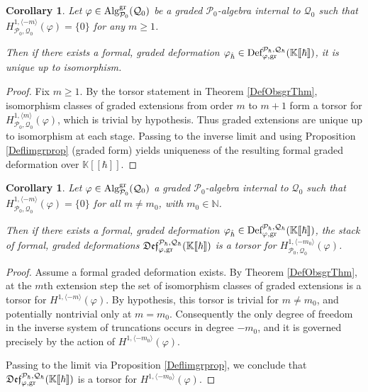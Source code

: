 \documentclass[11pt]{amsart}
\numberwithin{equation}{section}
\newtheorem{coro}[theo]{Corollary}
\theoremstyle{definition}
\newcommand{\bb}{\mathbb}
\newcommand{\mc}{\mathcal}
\newcommand{\Def}{{\textup{Def}}}
\newcommand{\fDef}{{\mathfrak{Def}}}
\newcommand{\Ph}{{\mathcal{P}_\hbar}}
\newcommand{\Qh}{{\mathcal{Q}_\hbar}}
\newcommand{\fph}{{[\![\hbar]\!]}}
\newcommand{\gd}{{\textup{gr}}}
\newcommand{\K}{{\bb K}}
\newcommand{\Alg}{{\textup{Alg}}}
\newcommand{\0}{{\textbf{0}}}
\def\IN{\mathbb{N}}
\begin{document}
\begin{coro}\label{forungrcoro} 
Let $\varphi\in \Alg_{\mc P_0}^\gd(\mc Q_0)$ be a graded $\mc P_0$-algebra internal to $\mc Q_0$ such that $H^{1,\langle -m\rangle}_{\mc P_0,\mc Q_0}(\varphi)=\{0\}$ for any $m\ge1$.

Then if there exists a formal, graded deformation $\varphi_{\hat{\hbar}}\in \Def_{\varphi,\gd}^{\Ph,\Qh}(\K\fph)$, it is unique up to isomorphism.
	
\end{coro}
\begin{proof}
Fix $m\ge 1$. By the torsor statement in Theorem \ref{DefObsgrThm}, isomorphism classes of graded extensions from order $m$ to $m+1$ form a torsor for $H^{1,\langle m\rangle}_{\mc P_0,\mc Q_0}(\varphi)$, which is trivial by hypothesis. Thus graded extensions are unique up to isomorphism at each stage. Passing to
the inverse limit and using Proposition \ref{Deflimgrprop} (graded form) yields uniqueness of the resulting formal graded deformation over $\K\fph$.
\end{proof}

\begin{coro}\label{grtorcoro} 
Let $\varphi\in \Alg_{\mc P_0}^\gd(\mc Q_0)$ a graded $\mc P_0$-algebra internal to $\mc Q_0$ such that \mbox{$H^{1,\langle -m \rangle}_{\mc P_0,\mc Q_0}(\varphi)=\{0\}$} for all $m\neq m_0$, with $m_0 \in \IN$. 

Then if there exists a formal, graded deformation $\varphi_{\hat{\hbar}}\in \Def_{\varphi,\gd}^{\Ph,\Qh}(\K\fph)$, the stack of formal, graded deformations $\fDef_{\varphi,\gd}^{\Ph,\Qh}(\K\fph)  $ is a torsor for $H^{1,\langle -m_0 \rangle}_{\mc P_0,\mc Q_0}(\varphi)$.
\end{coro}
\begin{proof}
	Assume a formal graded deformation exists. By Theorem \ref{DefObsgrThm}, at the $m$th extension step the set of isomorphism classes of graded extensions is a torsor for $H^{1,\langle -m\rangle}(\varphi)$. By hypothesis, this torsor is trivial for $m\neq m_0$, and potentially nontrivial only at $m=m_0$. Consequently the only degree of freedom in the inverse system of truncations occurs in degree $-m_0$, and it is governed precisely by the action of $H^{1,\langle -m_0\rangle}(\varphi)$. 

	Passing to the limit via Proposition \ref{Deflimgrprop}, we conclude that $\fDef_{\varphi,\gd}^{\Ph,\Qh}(\K\fph)$ is a torsor for $H^{1,\langle - m_0\rangle}(\varphi)$.
\end{proof}
\end{document}
